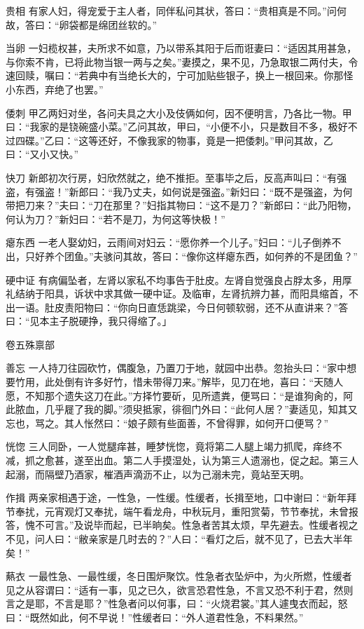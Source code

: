 \documentclass[12pt,UTF8]{ctexbook}
\begin{document}
贵相
有家人妇，得宠爱于主人者，同伴私问其状，答曰：“贵相真是不同。”问何故，答曰：“卵袋都是绵团丝软的。”

当卵
一妇榄权甚，夫所求不如意，乃以带系其阳于后而诳妻曰：“适因其用甚急，与你索不肯，已将此物当银一两与之矣。”妻摸之，果不见，乃急取银二两付夫，令速回赎，嘱曰：“若典中有当绝长大的，宁可加贴些银子，换上一根回来。你那怪小东西，弃绝了也罢。”

倭刺
甲乙两妇对坐，各问夫具之大小及伎俩如何，因不便明言，乃各比一物。甲曰：“我家的是铙碗盛小菜。”乙问其故，甲曰，“小便不小，只是数目不多，极好不过四碟。”乙曰：“这等还好，不像我家的物事，竟是一把倭刺。”甲问其故，乙曰：“又小又快。”

快刀
新郎初次行房，妇欣然就之，绝不推拒。至事毕之后，反高声叫曰：“有强盗，有强盗！”新郎曰：“我乃丈夫，如何说是强盗。”新妇曰：“既不是强盗，为何带把刀来？”夫曰：“刀在那里？”妇指其物曰：“这不是刀？”新郎曰：“此乃阳物，何认为刀？”新妇曰：“若不是刀，为何这等快极！”

瘪东西
一老人娶幼妇，云雨间对妇云：“愿你养一个儿子。”妇曰：“儿子倒养不出，只好养个团鱼。”夫骇问其故，答曰：“像你这样瘪东西，如何养的不是团鱼？”

硬中证
有病偏坠者，左肾以家私不均事告于肚皮。左肾自觉强良占脬太多，用厚礼结纳于阳具，诉状中求其做一硬中证。及临审，左肾抗辨力甚，而阳具缩首，不出一语。肚皮责阳物曰：“你向日直恁跳梁，今日何顿软弱，还不从直讲来？”答曰：“见本主子脱硬挣，我只得缩了。」

卷五殊禀部

善忘
一人持刀往园砍竹，偶腹急，乃置刀于地，就园中出恭。忽抬头曰：“家中想要竹用，此处倒有许多好竹，惜未带得刀来。”解毕，见刀在地，喜曰：“天随人愿，不知那个遗失这刀在此。”方择竹要斫，见所遗粪，便骂曰：“是谁狗肏的，阿此脓血，几乎屣了我的脚。”须臾抵家，徘徊门外曰：“此何人居？”妻适见，知其又忘也，骂之。其人怅然曰：“娘子颇有些面善，不曾得罪，如何开口便骂？”

恍惚
三人同卧，一人觉腿痒甚，睡梦恍惚，竟将第二人腿上竭力抓爬，痒终不减，抓之愈甚，遂至出血。第二人手摸湿处，认为第三人遗溺也，促之起。第三人起溺，而隔壁乃酒家，槯酒声滴沥不止，以为己溺未完，竟站至天明。

作揖
两亲家相遇于途，一性急，一性缓。性缓者，长揖至地，口中谢曰：“新年拜节奉扰，元宵观灯又奉扰，端午看龙舟，中秋玩月，重阳赏菊，节节奉扰，未曾报答，愧不可言。”及说毕而起，已半晌矣。性急者苦其太烦，早先避去。性缓者视之不见，问人曰：“敝亲家是几时去的？”人曰：“看灯之后，就不见了，已去大半年矣！”

爇衣
一最性急、一最性缓，冬日围炉聚饮。性急者衣坠炉中，为火所燃，性缓者见之从容谓曰：“适有一事，见之已久，欲言恐君性急，不言又恐不利于君，然则言之是耶，不言是耶？”性急者问以何事，曰：“火烧君裳。”其人遽曳衣而起，怒曰：“既然如此，何不早说！”性缓者曰：“外人道君性急，不料果然。”
\end{document}
